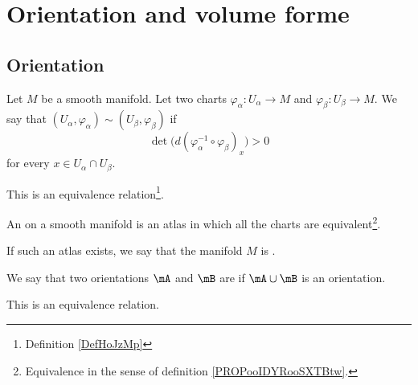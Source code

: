 

\section{Orientation and volume forme}

\subsection{Orientation}


\begin{propositionDef}		\label{PROPooIDYRooSXTBtw}		\label{DEFooGMOQooVzqFxy}
	Let \( M\) be  a smooth manifold. Let two charts \(\varphi_{\alpha} \colon  U_{\alpha}\to M  \) and \(\varphi_{\beta} \colon U_{\beta}\to M  \). We say that \( (U_{\alpha}, \varphi_{\alpha})\sim (U_{\beta}, \varphi_{\beta})\) if
	\begin{equation}
		\det\big( d(\varphi_{\alpha}^{-1}\circ \varphi_{\beta})_x \big)>0
	\end{equation}
	for every \( x\in U_{\alpha}\cap U_{\beta}\).

	This is an equivalence relation\footnote{Definition \ref{DefHoJzMp}}.
\end{propositionDef}

\begin{definition}		\label{DEFooAQPOooJeSRAt}	\label{DEFooQZJPooOwMbim}
	An  on a smooth manifold is an atlas in which all the charts are equivalent\footnote{Equivalence in the sense of definition \ref{PROPooIDYRooSXTBtw}.}.

	If such an atlas exists, we say that the manifold \( M\) is .
\end{definition}


\begin{propositionDef}		\label{PROPooMKHKooUTiUjF}
	We say that two orientations \( \mA\) and \( \mB\) are  if \( \mA\cup\mB\) is an orientation.

	This is an equivalence relation.
\end{propositionDef}


